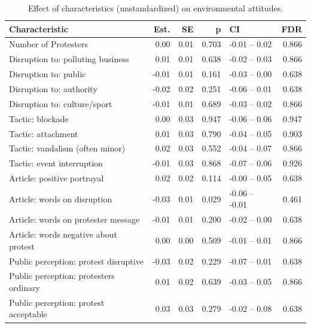 \begin{table}[h!t]
\centering
\begin{tabular}{lrrrlr}
  \hline
Characteristic & Est. & SE & p & CI & FDR \\ 
  \hline
Number of Protesters & 0.00 & 0.01 & 0.703 & -0.01 -- 0.02 & 0.866 \\ 
  Disruption to: polluting business & 0.01 & 0.01 & 0.638 & -0.02 -- 0.03 & 0.866 \\ 
  Disruption to: public & -0.01 & 0.01 & 0.161 & -0.03 -- 0.00 & 0.638 \\ 
  Disruption to: authority & -0.02 & 0.02 & 0.251 & -0.06 -- 0.01 & 0.638 \\ 
  Disruption to: culture/sport & -0.01 & 0.01 & 0.689 & -0.03 -- 0.02 & 0.866 \\ 
  Tactic: blockade & 0.00 & 0.03 & 0.947 & -0.06 -- 0.06 & 0.947 \\ 
  Tactic: attachment & 0.01 & 0.03 & 0.790 & -0.04 -- 0.05 & 0.903 \\ 
  Tactic: vandalism (often minor) & 0.02 & 0.03 & 0.552 & -0.04 -- 0.07 & 0.866 \\ 
  Tactic: event interruption & -0.01 & 0.03 & 0.868 & -0.07 -- 0.06 & 0.926 \\ 
  Article: positive portrayal & 0.02 & 0.02 & 0.114 & -0.00 -- 0.05 & 0.638 \\ 
  Article: words on disruption & -0.03 & 0.01 & 0.029 & -0.06 -- -0.01 & 0.461 \\ 
  Article: words on protester message & -0.01 & 0.01 & 0.200 & -0.02 -- 0.00 & 0.638 \\ 
  Article: words negative about protest & 0.00 & 0.00 & 0.509 & -0.01 -- 0.01 & 0.866 \\ 
  Public perception: protest disruptive & -0.03 & 0.02 & 0.229 & -0.07 -- 0.01 & 0.638 \\ 
  Public perception: protesters ordinary & 0.01 & 0.02 & 0.639 & -0.03 -- 0.05 & 0.866 \\ 
  Public perception: protest acceptable & 0.03 & 0.03 & 0.279 & -0.02 -- 0.08 & 0.638 \\ 
   \hline
\end{tabular}
\caption{Effect of characteristics (unstandardized) on environmental attitudes.} 
\label{tab:char_unstand}
\end{table}
